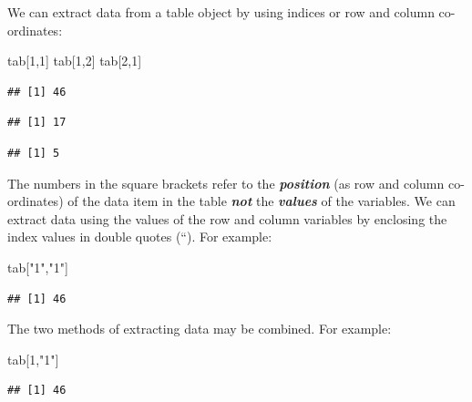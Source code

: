 \documentclass[
  12pt,
]{book}
\newenvironment{Shaded}{\begin{snugshade}}{\end{snugshade}}
\newcommand{\DecValTok}[1]{\textcolor[rgb]{0.00,0.00,0.81}{#1}}
\newcommand{\NormalTok}[1]{#1}
\newcommand{\StringTok}[1]{\textcolor[rgb]{0.31,0.60,0.02}{#1}}
\begin{document}
We can extract data from a table object by using indices or row and column co-ordinates:

\begin{Shaded}
\begin{Highlighting}[]
\NormalTok{tab[}\DecValTok{1}\NormalTok{,}\DecValTok{1}\NormalTok{]}
\NormalTok{tab[}\DecValTok{1}\NormalTok{,}\DecValTok{2}\NormalTok{]}
\NormalTok{tab[}\DecValTok{2}\NormalTok{,}\DecValTok{1}\NormalTok{]}
\end{Highlighting}
\end{Shaded}

\begin{verbatim}
## [1] 46
\end{verbatim}

\begin{verbatim}
## [1] 17
\end{verbatim}

\begin{verbatim}
## [1] 5
\end{verbatim}

The numbers in the square brackets refer to the \textbf{\emph{position}} (as row and column co-ordinates) of the data item in the table \textbf{\emph{not}} the \textbf{\emph{values}} of the variables. We can extract data using the values of the row and column variables by enclosing the index values in double quotes (``). For example:

\begin{Shaded}
\begin{Highlighting}[]
\NormalTok{tab[}\StringTok{"1"}\NormalTok{,}\StringTok{"1"}\NormalTok{]}
\end{Highlighting}
\end{Shaded}

\begin{verbatim}
## [1] 46
\end{verbatim}

\newpage

The two methods of extracting data may be combined. For example:

\begin{Shaded}
\begin{Highlighting}[]
\NormalTok{tab[}\DecValTok{1}\NormalTok{,}\StringTok{"1"}\NormalTok{]}
\end{Highlighting}
\end{Shaded}

\begin{verbatim}
## [1] 46
\end{verbatim}
\end{document}
